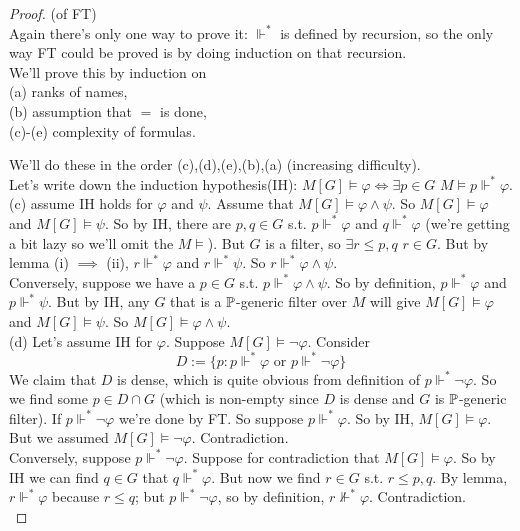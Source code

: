 \documentclass[a4paper]{article}
\begin{document}
\begin{proof} (of FT)\\
Again there's only one way to prove it: $\Vdash^*$ is defined by recursion, so the only way FT could be proved is by doing induction on that recursion.\\
We'll prove this by induction on\\
(a) ranks of names,\\
(b) assumption that $=$ is done,\\
(c)-(e) complexity of formulas.

We'll do these in the order (c),(d),(e),(b),(a) (increasing difficulty).\\
Let's write down the induction hypothesis(IH): $M[G] \vDash \varphi \iff \exists p \in G$ $M \vDash p \Vdash^* \varphi$.\\
(c) assume IH holds for $\varphi$ and $\psi$. Assume that $M[G] \vDash \varphi \wedge \psi$. So $M[G] \vDash \varphi$ and $M[G] \vDash \psi$. So by IH, there are $p,q \in G$ s.t. $p \Vdash^* \varphi$ and $q \Vdash^* \varphi$ (we're getting a bit lazy so we'll omit the $M\vDash$). But $G$ is a filter, so $\exists r \leq p,q$ $r \in G$. But by lemma (i) $\implies$ (ii), $r \Vdash^* \varphi$ and $r \Vdash^* \psi$. So $r \Vdash^* \varphi \wedge \psi$.\\
Conversely, suppose we have a $p \in G$ s.t. $p \Vdash^* \varphi \wedge \psi$. So by definition, $p \Vdash^*\varphi$ and $p \Vdash^* \psi$. But by IH, any $G$ that is a $\P$-generic filter over $M$ will give $M[G] \vDash \varphi$ and $M[G] \vDash \psi$. So $M[G] \vDash \varphi \wedge \psi$.\\
(d) Let's assume IH for $\varphi$. Suppose $M[G] \vDash \neg\varphi$. Consider
\[
D:=\{p:p \Vdash^* \varphi \text{ or } p \Vdash^* \neg\varphi\}
\]
We claim that $D$ is dense, which is quite obvious from definition of $p \Vdash^* \neg\varphi$. So we find some $p \in D \cap G$ (which is non-empty since $D$ is dense and $G$ is $\P$-generic filter). If $p \Vdash^* \neg \varphi$ we're done by FT. So suppose $p \Vdash^* \varphi$. So by IH, $M[G] \vDash \varphi$. But we assumed $M[G] \vDash \neg\varphi$. Contradiction.\\
Conversely, suppose $p \Vdash^* \neg\varphi$. Suppose for contradiction that $M[G] \vDash \varphi$. So by IH we can find $q \in G$ that $q \Vdash^* \varphi$. But now we find $r \in G$ s.t. $r \leq p,q$. By lemma, $r \Vdash^* \varphi$ because $r \leq q$; but $p \Vdash^* \neg\varphi$, so by definition, $r \not\Vdash^* \varphi$. Contradiction.\\

\end{proof}
\end{document}
